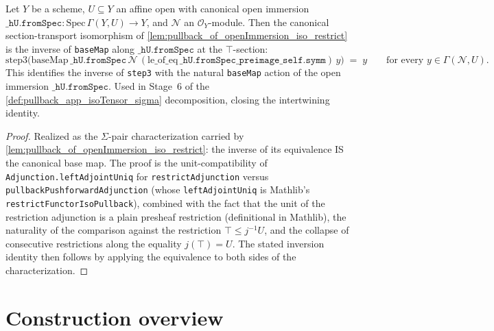 \begin{lemma}
  \label{lem:baseMap_inv_step3_open_immersion}
  \leanok
  Let \(Y\) be a scheme, \(U \subseteq Y\) an affine open with
  canonical open immersion
  \(\mathtt{\_hU.fromSpec} : \text{Spec}\,\Gamma(Y, U) \to Y\), and
  \(\mathcal N\) an \(\mathcal O_Y\)-module. Then the canonical
  section-transport isomorphism of
  \cref{lem:pullback_of_openImmersion_iso_restrict} is the inverse
  of \texttt{baseMap} along \(\mathtt{\_hU.fromSpec}\) at the
  \(\top\)-section:
  \[
    \text{step3}\bigl(
      \text{baseMap}\,\mathtt{\_hU.fromSpec}\,
        \mathcal N\,
        (\text{le\_of\_eq}\,\mathtt{\_hU.fromSpec\_preimage\_self.symm})\,y
    \bigr) \;=\; y
    \qquad\text{for every } y \in \Gamma(\mathcal N, U).
  \]
  This identifies the inverse of \texttt{step3} with the natural
  \texttt{baseMap} action of the open immersion
  \(\mathtt{\_hU.fromSpec}\). Used in Stage~6 of the
  \cref{def:pullback_app_isoTensor_sigma} decomposition, closing the
  intertwining identity.
\end{lemma}
\begin{proof}
  \leanok
  Realized as the \(\Sigma\)-pair characterization carried by
  \cref{lem:pullback_of_openImmersion_iso_restrict}: the inverse of
  its equivalence IS the canonical base map. The proof is the
  unit-compatibility of \texttt{Adjunction.leftAdjointUniq} for
  \texttt{restrictAdjunction} versus
  \texttt{pullbackPushforwardAdjunction} (whose
  \texttt{leftAdjointUniq} is Mathlib's
  \texttt{restrictFunctorIsoPullback}), combined with the fact that
  the unit of the restriction adjunction is a plain presheaf
  restriction (definitional in Mathlib), the naturality of the
  comparison against the restriction
  \(\top \le j^{-1}U\), and the collapse of consecutive
  restrictions along the equality \(j(\top) = U\). The stated
  inversion identity then follows by applying the equivalence to both
  sides of the characterization.
\end{proof}

\section{Construction overview}
\label{sec:quot_lean_encoding}

